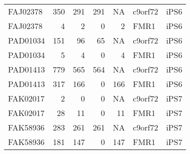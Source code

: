 \begin{longtable}{lrrrrll}
FAJ02378 & 350   & 291   & 291       & NA       & c9orf72 & iPS6    \\
FAJ02378 & 4     & 2     & 0         & 2        & FMR1    & iPS6    \\
PAD01034 & 151   & 96    & 65        & NA       & c9orf72 & iPS6    \\
PAD01034 & 5     & 4     & 0         & 4        & FMR1    & iPS6    \\
PAD01413 & 779   & 565   & 564       & NA       & c9orf72 & iPS6    \\
PAD01413 & 317   & 166   & 0         & 166      & FMR1    & iPS6    \\
FAK02017 & 2     & 0     & 0         & NA       & c9orf72 & iPS7    \\
FAK02017 & 28    & 11    & 0         & 11       & FMR1    & iPS7    \\
FAK58936 & 283   & 261   & 261       & NA       & c9orf72 & iPS7    \\
FAK58936 & 181   & 147   & 0         & 147      & FMR1    & iPS7   
\end{longtable}




